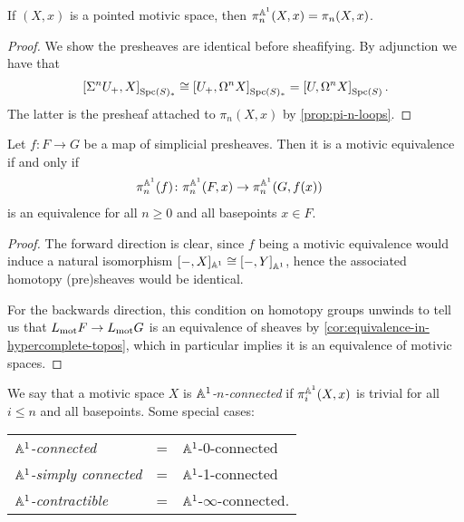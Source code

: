 \documentclass[11pt,openany]{book}
\begin{document}
\begin{proposition} If $(X,x)$ is a pointed motivic space, then $\pi_n^{\mathbb{A}^1}(X,x) = \pi_n(X,x)$.
\end{proposition}
\begin{proof} We show the presheaves are identical before sheafifying. By adjunction we have that
\begin{align*}
    \left[ \Sigma^n U_+, X \right]_{\mathrm{Spc}(S)_\ast} \cong \left[ U_+, \Omega^n X \right]_{\mathrm{Spc}(S)_\ast} = \left[ U, \Omega^n X \right]_{\mathrm{Spc}(S)}.
\end{align*}
The latter is the presheaf attached to $\pi_n(X,x)$ by \autoref{prop:pi-n-loops}.
\end{proof}

\begin{proposition}\label{prop:motivic-equiv-can-be-checked-on-htpy-sheaves} 
Let $f\colon F\to G$ be a map of simplicial presheaves. Then it is a motivic equivalence if and only if
\begin{align*}
    \pi_n^{\mathbb{A}^1}(f) \colon \pi_n^{\mathbb{A}^1}(F,x) &\to \pi_n^{\mathbb{A}^1}(G,f(x))
\end{align*}
is an equivalence for all $n\ge0$ and all basepoints $x\in F$.
\end{proposition}
\begin{proof} The forward direction is clear, since $f$ being a motivic equivalence would induce a natural isomorphism $[-,X]_{\mathbb{A}^1} \cong \left[ -,Y \right]_{\mathbb{A}^1}$, hence the associated homotopy (pre)sheaves would be identical.

For the backwards direction, this condition on homotopy groups unwinds to tell us that $L_{\mathrm{mot}} F \to L_{\mathrm{mot}} G$ is an equivalence of sheaves by \autoref{cor:equivalence-in-hypercomplete-topos}, which in particular implies it is an equivalence of motivic spaces.
\end{proof}

\begin{terminology} We say that a motivic space $X$ is $\mathbb{A}^1$\textit{-$n$-connected} if $\pi_i^{\mathbb{A}^1}(X,x)$ is trivial for all $i\le n$ and all basepoints. Some special cases:
\begin{center}
    \begin{tabular}{l l l}
    $\mathbb{A}^1$\textit{-connected} &= & $\mathbb{A}^1$-0-connected \\
    $\mathbb{A}^1$\textit{-simply connected} &= & $\mathbb{A}^1$-1-connected \\
    $\mathbb{A}^1$\textit{-contractible} &= & $\mathbb{A}^1$-$\infty$-connected.
    \end{tabular}
\end{center}
\end{terminology}
\end{document}
